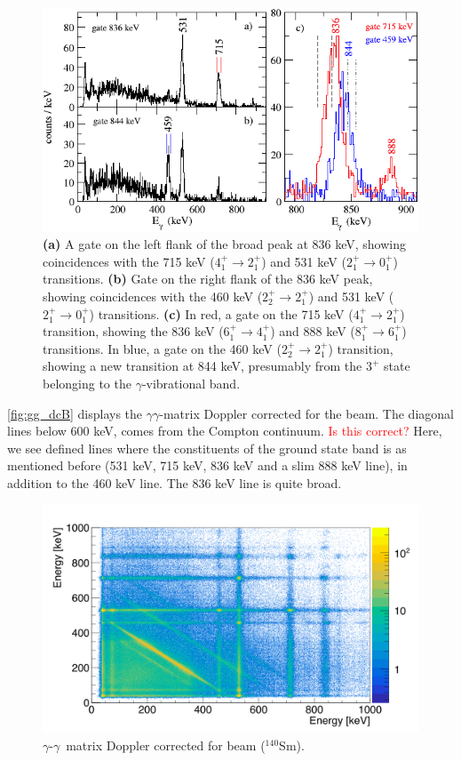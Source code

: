 \documentclass[twoside,english]{uiofysmaster/uiofysmaster}
\newcommand{\Sm}{$^{140}$Sm} %
\newcommand{\ga}{$\gamma$}
\let\orgautoref\autoref
\renewcommand{\autoref}
        {%
		 \def\sectionautorefname{Section}%
		 \def\subsectionautorefname{Section}%
		 \def\subsubsectionautorefname{Section}%
		 \def\chapterautorefname{Chapter}%
          \orgautoref}
\begin{document}
\begin{figure}[htb]
	\centering
	\includegraphics[width=\textwidth]{Images/check_state.png}
	\caption{\textbf{(a)} A gate on the left flank of the broad peak at 836 keV, showing coincidences with the 715 keV ($4_1^+ \rightarrow 2_1^+$) and 531 keV ($2_1^+ \rightarrow 0_1^+$) transitions.
	\textbf{(b)} Gate on the right flank of the 836 keV peak, showing coincidences with the 460 keV ($2_2^+ \rightarrow 2_1^+$) and 531 keV ($2_1^+ \rightarrow 0_1^+$) transitions.
	\textbf{(c)} In red, a gate on the 715 keV ($4_1^+ \rightarrow 2_1^+$) transition, showing the 836 keV ($6_1^+ \rightarrow 4_1^+$) and 888 keV ($8_1^+ \rightarrow 6_1^+$) transitions. In blue, a gate on the 460 keV ($2_2^+ \rightarrow 2_1^+$) transition, showing a new transition at 844 keV, presumably from the $3^+$ state belonging to the \ga-vibrational band.
	}
	\label{fig:check_state}
\end{figure}

\autoref{fig:gg_dcB} displays the \ga\ga-matrix Doppler corrected for the beam.
The diagonal lines below 600 keV, comes from the Compton continuum. \textcolor{red}{Is this correct?} 
Here, we see defined lines where the constituents of the ground state band is as mentioned before (531 keV, 715 keV, 836 keV and a slim 888 keV line), in addition to the 460 keV line. 
The 836 keV line is quite broad.

\begin{figure}[htb!]
	\centering
	\includegraphics[width=\textwidth]{../Plots/plotting/gg_dcB.png}
	\caption{\ga-\ga\ matrix Doppler corrected for beam (\Sm).}
	\label{fig:gg_dcB}
\end{figure}
\end{document}
